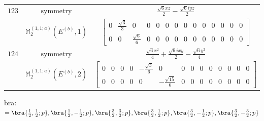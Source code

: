 \documentclass[fleqn,8pt,landscape]{jsarticle}
\begin{document}
\begin{longtable}{ccc}
$ 123 $ & $ \text{symmetry} $ & $ \frac{\sqrt{6} x z}{2} - \frac{\sqrt{6} i y z}{2} $ \\
$  $ & $ \mathbb{M}_{2}^{(1,1;a)}(E^{(b)},1) $ & $ \begin{bmatrix} 0 & \frac{\sqrt{3}}{3} & 0 & 0 & 0 & 0 & 0 & 0 & 0 & 0 & 0 & 0 & 0 & 0 \\ 0 & 0 & \frac{\sqrt{6}}{6} & 0 & 0 & 0 & 0 & 0 & 0 & 0 & 0 & 0 & 0 & 0 \end{bmatrix} $ \\ \hline
$ 124 $ & $ \text{symmetry} $ & $ \frac{\sqrt{6} x^{2}}{4} + \frac{\sqrt{6} i x y}{2} - \frac{\sqrt{6} y^{2}}{4} $ \\
$  $ & $ \mathbb{M}_{2}^{(1,1;a)}(E^{(b)},2) $ & $ \begin{bmatrix} 0 & 0 & 0 & 0 & - \frac{\sqrt{3}}{6} & 0 & 0 & 0 & 0 & 0 & 0 & 0 & 0 & 0 \\ 0 & 0 & 0 & 0 & 0 & - \frac{\sqrt{15}}{6} & 0 & 0 & 0 & 0 & 0 & 0 & 0 & 0 \end{bmatrix} $ \\ \hline
\end{longtable}
bra: $=\bra{\frac{1}{2},\frac{1}{2};p}, \bra{\frac{1}{2},- \frac{1}{2};p}, \bra{\frac{3}{2},\frac{3}{2};p}, \bra{\frac{3}{2},\frac{1}{2};p}, \bra{\frac{3}{2},- \frac{1}{2};p}, \bra{\frac{3}{2},- \frac{3}{2};p}$
\end{document}
